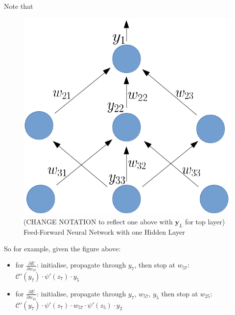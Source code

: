 \documentclass[a4paper,11pt]{article}
\begin{document}
Note that 

\begin{figure}[h!]
	\centering
	\includegraphics[scale=0.28]{images/gradient_propagates.png}
	\caption{(CHANGE NOTATION to reflect one above with $\textbf{y}_L$ for top layer) Feed-Forward Neural Network with one Hidden Layer}
\end{figure}

So for example, given the figure above:
\begin{itemize}
\renewcommand\labelitemi{--}
\item for $\frac{\partial{E}}{\partial{w_{57}}}$: initialise, propagate through $y_{7}$, then stop at $w_{57}$:
 $ \mathcal{C}'(y_{7}) \cdot \psi'(z_7) \cdot y_5$ 
\item for $\frac{\partial{E}}{\partial{w_{25}}}$: initialise, propagate through $y_{7}$, $w_{57}$, $y_{5}$ then stop at $w_{25}$:
 $\mathcal{C}'(y_{7}) \cdot \psi'(z_7) \cdot w_{57} \cdot \psi'(z_5) \cdot y_2$ \\
\end{itemize}

\end{document}

